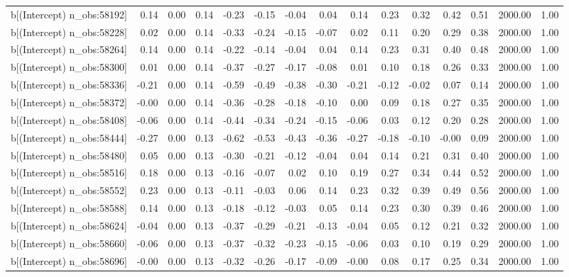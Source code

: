 \begin{table}[ht]
\begin{tabular}{rrrrrrrrrrrrrrr}
  b[(Intercept) n\_obs:58192] & 0.14 & 0.00 & 0.14 & -0.23 & -0.15 & -0.04 & 0.04 & 0.14 & 0.23 & 0.32 & 0.42 & 0.51 & 2000.00 & 1.00 \\ 
  b[(Intercept) n\_obs:58228] & 0.02 & 0.00 & 0.14 & -0.33 & -0.24 & -0.15 & -0.07 & 0.02 & 0.11 & 0.20 & 0.29 & 0.38 & 2000.00 & 1.00 \\ 
  b[(Intercept) n\_obs:58264] & 0.14 & 0.00 & 0.14 & -0.22 & -0.14 & -0.04 & 0.04 & 0.14 & 0.23 & 0.31 & 0.40 & 0.48 & 2000.00 & 1.00 \\ 
  b[(Intercept) n\_obs:58300] & 0.01 & 0.00 & 0.14 & -0.37 & -0.27 & -0.17 & -0.08 & 0.01 & 0.10 & 0.18 & 0.26 & 0.33 & 2000.00 & 1.00 \\ 
  b[(Intercept) n\_obs:58336] & -0.21 & 0.00 & 0.14 & -0.59 & -0.49 & -0.38 & -0.30 & -0.21 & -0.12 & -0.02 & 0.07 & 0.14 & 2000.00 & 1.00 \\ 
  b[(Intercept) n\_obs:58372] & -0.00 & 0.00 & 0.14 & -0.36 & -0.28 & -0.18 & -0.10 & 0.00 & 0.09 & 0.18 & 0.27 & 0.35 & 2000.00 & 1.00 \\ 
  b[(Intercept) n\_obs:58408] & -0.06 & 0.00 & 0.14 & -0.44 & -0.34 & -0.24 & -0.15 & -0.06 & 0.03 & 0.12 & 0.20 & 0.28 & 2000.00 & 1.00 \\ 
  b[(Intercept) n\_obs:58444] & -0.27 & 0.00 & 0.13 & -0.62 & -0.53 & -0.43 & -0.36 & -0.27 & -0.18 & -0.10 & -0.00 & 0.09 & 2000.00 & 1.00 \\ 
  b[(Intercept) n\_obs:58480] & 0.05 & 0.00 & 0.13 & -0.30 & -0.21 & -0.12 & -0.04 & 0.04 & 0.14 & 0.21 & 0.31 & 0.40 & 2000.00 & 1.00 \\ 
  b[(Intercept) n\_obs:58516] & 0.18 & 0.00 & 0.13 & -0.16 & -0.07 & 0.02 & 0.10 & 0.19 & 0.27 & 0.34 & 0.44 & 0.52 & 2000.00 & 1.00 \\ 
  b[(Intercept) n\_obs:58552] & 0.23 & 0.00 & 0.13 & -0.11 & -0.03 & 0.06 & 0.14 & 0.23 & 0.32 & 0.39 & 0.49 & 0.56 & 2000.00 & 1.00 \\ 
  b[(Intercept) n\_obs:58588] & 0.14 & 0.00 & 0.13 & -0.18 & -0.12 & -0.03 & 0.05 & 0.14 & 0.23 & 0.30 & 0.39 & 0.46 & 2000.00 & 1.00 \\ 
  b[(Intercept) n\_obs:58624] & -0.04 & 0.00 & 0.13 & -0.37 & -0.29 & -0.21 & -0.13 & -0.04 & 0.05 & 0.12 & 0.21 & 0.32 & 2000.00 & 1.00 \\ 
  b[(Intercept) n\_obs:58660] & -0.06 & 0.00 & 0.13 & -0.37 & -0.32 & -0.23 & -0.15 & -0.06 & 0.03 & 0.10 & 0.19 & 0.29 & 2000.00 & 1.00 \\ 
  b[(Intercept) n\_obs:58696] & -0.00 & 0.00 & 0.13 & -0.32 & -0.26 & -0.17 & -0.09 & -0.00 & 0.08 & 0.17 & 0.25 & 0.34 & 2000.00 & 1.00 \\ 

\end{tabular}
\end{table}
